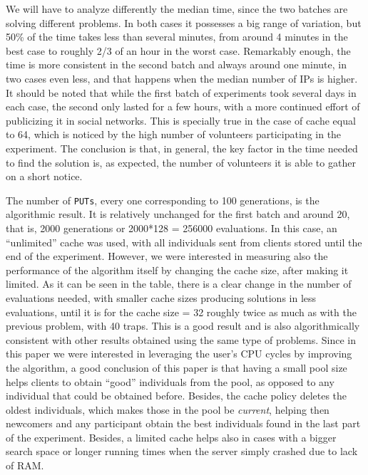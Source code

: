 \documentclass[letterpaper]{article}
\begin{document}
We will have to analyze differently the median time, since the two
batches are solving different problems. In both cases it possesses a
big range of variation, but 50\% of 
the time takes less than several minutes, from around 4 minutes in the
best case to roughly 2/3 of an hour in the worst case. Remarkably
enough, the time is more consistent in the second batch and always
around one minute, in two cases even less, and that happens when the
median number of IPs is higher. It should be noted that while the
first batch of experiments took several days in each case, the second
only lasted for a few hours, with a more continued effort of
publicizing it in social networks. This is specially true in the
case of cache equal to 64, which is noticed by the high number of
volunteers participating in the experiment. The conclusion is that,
in general, the key factor in the time needed to find the solution
is, as expected, the number of volunteers it is able to gather on a
short notice. 

The number of {\tt PUTs}, every one corresponding to 100 generations,
is the algorithmic result. It is relatively unchanged for the first
batch and around 20, that is, 2000 generations or 2000*128 = 256000
evaluations. In this case, an ``unlimited'' cache was used, with all
individuals sent from clients stored until the end of the
experiment. However, we were interested in measuring also the
performance of the algorithm itself by changing the cache size, after
making it limited. As it can be seen in the table, there is a clear
change in the number of evaluations needed, with smaller cache sizes
producing solutions in less evaluations, until it is for the cache
size = 32 roughly twice as much as with the previous problem, with 40
traps. This is a good result and is also algorithmically consistent
with other results obtained using the same type of problems. Since in
this paper we were interested in leveraging the user's CPU cycles by
improving the algorithm, a good conclusion of this paper is that
having a small pool size helps clients to obtain ``good'' individuals
from the pool, as opposed to any individual that could be obtained
before. Besides, the cache policy deletes the oldest individuals, which
makes those in the pool be {\em current}, helping then newcomers and %
any participant obtain the best individuals found in the last part of
the experiment. Besides, a limited cache helps also in cases with a
bigger search space or longer running times when the server simply
crashed due to lack of RAM. 
\end{document}
